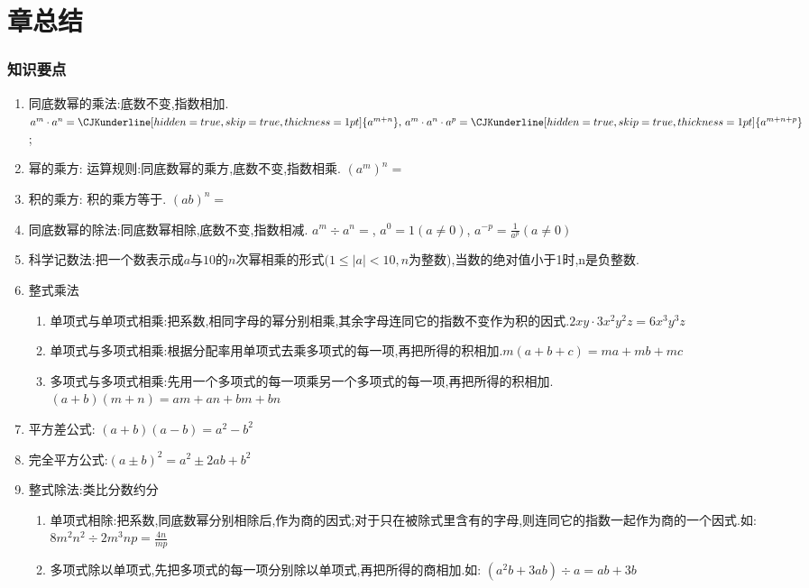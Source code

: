 \documentclass[cn,blue,12pt]{elegantbook}
\renewcommand \tkt[1]{{\CJKunderline[hidden=true, skip=true, thickness=1pt]{#1}}}
\begin{document}
\section{章总结}%
\label{sec:章总结}

\subsubsection{知识要点}%
\label{ssub:知识要点}

\begin{enumerate}
    \item 同底数幂的乘法:底数不变,指数相加.\(a^m \cdot a^n = \tkt{a^{m+n}}, \, a^m \cdot a^n \cdot a^p = \tkt{a^{m+n+p}}\);
    \item 幂的乘方: 运算规则:同底数幂的乘方,底数不变,指数相乘.  \((a^m)^n = \)\tkt{\(a^{mn}\)}
    \item 积的乘方: 积的乘方等于\tkt{乘方的积}. \((ab)^n = \)\tkt{\(a^nb^n\)}
    \item 同底数幂的除法:同底数幂相除,底数不变,指数相减. \(a^m \div  a^n = \)\tkt{\(a^{m-n}\)}, \quad \(a^0=1(a\ne 0)\), \quad \(a^{-p}=\frac{1}{a^p}(a\ne 0)\)
    \item 科学记数法:把一个数表示成\(a\)与\(10\)的\(n\)次幂相乘的形式\((1\le |a|<10,n\)为整数),当数的绝对值小于1时,n是负整数.
    \item 整式乘法
        \begin{enumerate}
            \item 单项式与单项式相乘:把系数,相同字母的幂分别相乘,其余字母连同它的指数不变作为积的因式.\(2xy\cdot 3x^2y^2z=6x^3y^3z\)
            \item 单项式与多项式相乘:根据分配率用单项式去乘多项式的每一项,再把所得的积相加.\(m(a+b+c)=ma+mb+mc\)
            \item 多项式与多项式相乘:先用一个多项式的每一项乘另一个多项式的每一项,再把所得的积相加.\((a+b)(m+n)=am+an+bm+bn\)
        \end{enumerate}
    \item 平方差公式: \((a+b)(a-b)=a^2-b^2\)
    \item 完全平方公式:\((a \pm b)^2 = a^2 \pm 2ab + b^2\)
    \item 整式除法:类比分数约分
        \begin{enumerate}
            \item 单项式相除:把系数,同底数幂分别相除后,作为商的因式;对于只在被除式里含有的字母,则连同它的指数一起作为商的一个因式.如: \(8m^2n^2 \div 2m^3np = \frac{4n}{mp}\)
            \item 多项式除以单项式,先把多项式的每一项分别除以单项式,再把所得的商相加.如: \( (a^2b+3ab) \div a = ab + 3b \)
        \end{enumerate}
\end{enumerate}
\end{document}
